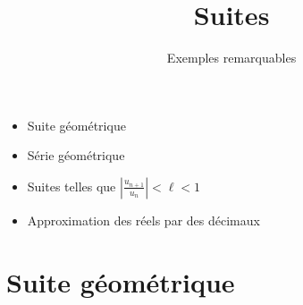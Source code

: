








\title{{\bf Suites}}
\subtitle{Exemples remarquables}


\begin{frame}
  
  \debutmontitre

  \pause

{\footnotesize
\hfill
{}
\begin{minipage}{0.6\textwidth}
  \begin{itemize}
    \item<3-> Suite géométrique
    \item<4-> Série géométrique
    \item<5-> Suites telles que $\left|\frac{u_{n+1}}{u_n}\right|<\ell<1$
    \item<6-> Approximation des réels par des décimaux
  \end{itemize}
\end{minipage}
}
\vspace*{1cm}
\end{frame}

\setcounter{framenumber}{0}

\section{Suite géométrique}

